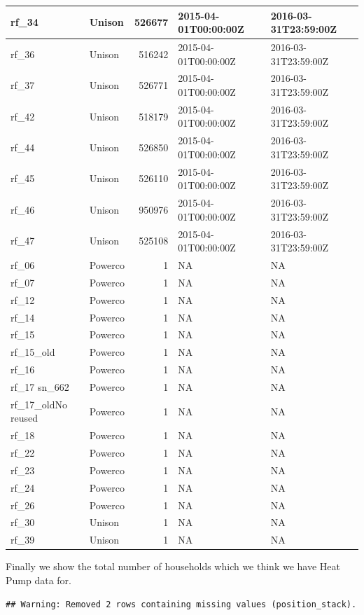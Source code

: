 \documentclass[]{article}
\begin{document}
\begin{table}
\begin{tabular}[t]{l|l|r|l|l}
\hline
rf\_34 & Unison & 526677 & 2015-04-01T00:00:00Z & 2016-03-31T23:59:00Z\\
\hline
rf\_36 & Unison & 516242 & 2015-04-01T00:00:00Z & 2016-03-31T23:59:00Z\\
\hline
rf\_37 & Unison & 526771 & 2015-04-01T00:00:00Z & 2016-03-31T23:59:00Z\\
\hline
rf\_42 & Unison & 518179 & 2015-04-01T00:00:00Z & 2016-03-31T23:59:00Z\\
\hline
rf\_44 & Unison & 526850 & 2015-04-01T00:00:00Z & 2016-03-31T23:59:00Z\\
\hline
rf\_45 & Unison & 526110 & 2015-04-01T00:00:00Z & 2016-03-31T23:59:00Z\\
\hline
rf\_46 & Unison & 950976 & 2015-04-01T00:00:00Z & 2016-03-31T23:59:00Z\\
\hline
rf\_47 & Unison & 525108 & 2015-04-01T00:00:00Z & 2016-03-31T23:59:00Z\\
\hline
rf\_06 & Powerco & 1 & NA & NA\\
\hline
rf\_07 & Powerco & 1 & NA & NA\\
\hline
rf\_12 & Powerco & 1 & NA & NA\\
\hline
rf\_14 & Powerco & 1 & NA & NA\\
\hline
rf\_15 & Powerco & 1 & NA & NA\\
\hline
rf\_15\_old & Powerco & 1 & NA & NA\\
\hline
rf\_16 & Powerco & 1 & NA & NA\\
\hline
rf\_17 sn\_662 & Powerco & 1 & NA & NA\\
\hline
rf\_17\_oldNo reused & Powerco & 1 & NA & NA\\
\hline
rf\_18 & Powerco & 1 & NA & NA\\
\hline
rf\_22 & Powerco & 1 & NA & NA\\
\hline
rf\_23 & Powerco & 1 & NA & NA\\
\hline
rf\_24 & Powerco & 1 & NA & NA\\
\hline
rf\_26 & Powerco & 1 & NA & NA\\
\hline
rf\_30 & Unison & 1 & NA & NA\\
\hline
rf\_39 & Unison & 1 & NA & NA\\
\hline
\end{tabular}
\end{table}

Finally we show the total number of households which we think we have
Heat Pump data for.

\begin{verbatim}
## Warning: Removed 2 rows containing missing values (position_stack).
\end{verbatim}
\end{document}
